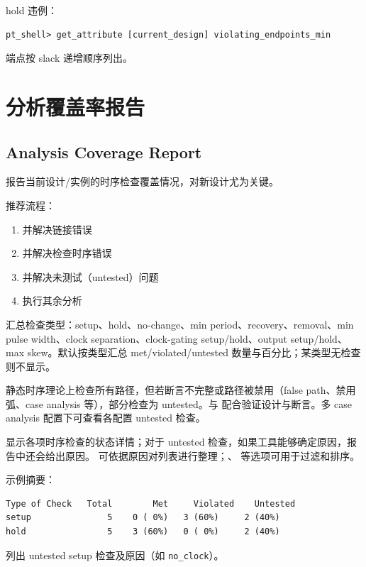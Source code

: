 hold 违例：
\begin{lstlisting}
pt_shell> get_attribute [current_design] violating_endpoints_min
\end{lstlisting}

端点按 slack 递增顺序列出。

\section{分析覆盖率报告}
\subsection*{Analysis Coverage Report}

 报告当前设计/实例的时序检查覆盖情况，对新设计尤为关键。

推荐流程：
\begin{enumerate}
  \item {} 并解决链接错误
  \item {} 并解决检查时序错误
  \item {} 并解决未测试（untested）问题
  \item 执行其余分析
\end{enumerate}

汇总检查类型：setup、hold、no-change、min period、recovery、removal、min pulse width、clock separation、clock-gating setup/hold、output setup/hold、max skew。默认按类型汇总 met/violated/untested 数量与百分比；某类型无检查则不显示。

静态时序理论上检查所有路径，但若断言不完整或路径被禁用（false path、禁用弧、case analysis 等），部分检查为 untested。与  配合验证设计与断言。多 case analysis 配置下可查看各配置 untested 检查。

 显示各项时序检查的状态详情；对于 untested 检查，如果工具能够确定原因，报告中还会给出原因。 可依据原因对列表进行整理；、 等选项可用于过滤和排序。

示例摘要：
\begin{verbatim}
Type of Check   Total        Met     Violated    Untested
setup               5    0 ( 0%)   3 (60%)     2 (40%)
hold                5    3 (60%)   0 ( 0%)     2 (40%)
\end{verbatim}

 列出 untested setup 检查及原因（如 \texttt{no\_clock}）。

